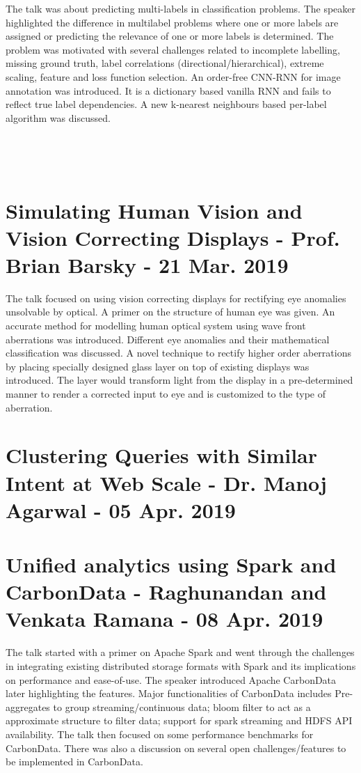 \documentclass[11pt,a4paper,oneside]{article}
\begin{document}
	The talk was about predicting multi-labels in classification problems. The speaker highlighted the difference in multilabel problems where one or more labels are assigned or predicting the relevance of one or more labels is determined. The problem was motivated with several challenges related to incomplete labelling, missing ground truth, label correlations (directional/hierarchical), extreme scaling, feature and loss function selection. An order-free CNN-RNN for image annotation was introduced. It is a dictionary based vanilla RNN and fails to reflect true label dependencies. A new k-nearest neighbours based per-label algorithm was discussed.
	
	\pagebreak
	
	\begin{verbatim}
	
	
	
	\end{verbatim}
	
	\section{Simulating Human Vision and Vision Correcting Displays - Prof. Brian Barsky - 21 Mar. 2019}
	
	The talk focused on using vision correcting displays for rectifying eye anomalies unsolvable by optical. A primer on the structure of human eye was given. An accurate method for modelling human optical system using wave front aberrations was introduced. Different eye anomalies and their mathematical classification was discussed. A novel technique to rectify higher order aberrations by placing specially designed glass layer on top of existing displays was introduced. The layer would transform light from the display in a pre-determined manner to render a corrected input to eye and is customized to the type of aberration. 
	
	\section{Clustering Queries with Similar Intent at Web Scale - Dr. Manoj Agarwal - 05 Apr. 2019}
		
	\section{Unified analytics using Spark and CarbonData - Raghunandan and Venkata Ramana - 08 Apr. 2019}
	
	The talk started with a primer on Apache Spark and went through the challenges in integrating existing distributed storage formats with Spark and its implications on performance and ease-of-use. The speaker introduced Apache CarbonData later highlighting the features. Major functionalities of CarbonData includes Pre-aggregates to group streaming/continuous data; bloom filter to act as a approximate structure to filter data; support for spark streaming and HDFS API availability. The talk then focused on some performance benchmarks for CarbonData. There was also a discussion on several open challenges/features to be implemented in CarbonData. 
	
\end{document}
